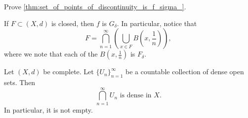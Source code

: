 \documentclass[notoc,notitlepage]{tufte-book}
\begin{document}
\begin{ex}
  Prove \cref{thm:set_of_points_of_discontinuity_is_f_sigma_}.
\end{ex}

\begin{eg}
  If $F \subset (X, d)$ is closed, then $f$ is $G_\delta$. In particular, notice that
  \begin{equation*}
    F = \bigcap_{n=1}^{\infty} \left( \bigcup_{x \in F} B \left( x, \frac{1}{n} \right) \right),
  \end{equation*}
  where we note that each of the $B \left( x, \frac{1}{n} \right)$ is $F_\delta$.
\end{eg}

\begin{thm}\label{thm:baire_category_theorem_i}
  Let $(X, d)$ be complete. Let $\{ U_n \}_{n = 1}^{\infty}$ be a countable collection of dense open sets. Then
  \begin{equation*}
    \bigcap_{n=1}^{\infty} U_n \text{ is dense in } X.
  \end{equation*}
  In particular, it is not empty.
\end{thm}
\end{document}
